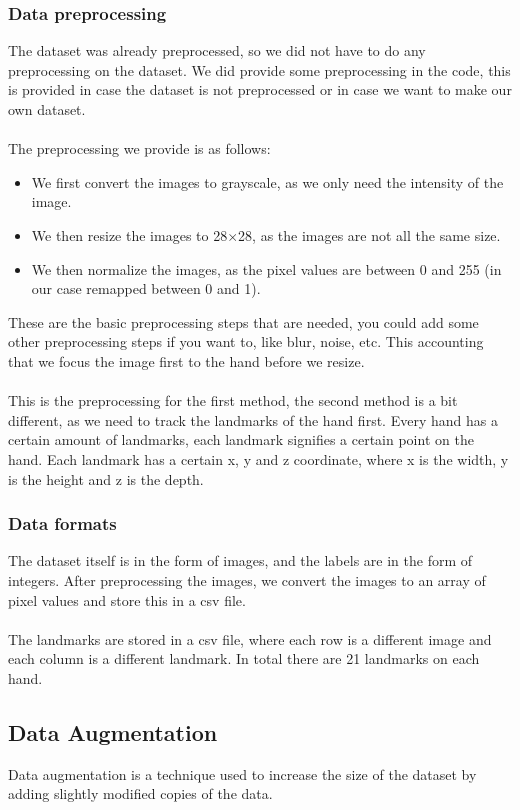 \documentclass[../paper.tex]{subfiles}
\begin{document}
    \subsubsection{Data preprocessing}
    The dataset was already preprocessed, so we did not have to do any preprocessing on the dataset. 
    We did provide some preprocessing in the code, this is provided in case the dataset is not preprocessed or in case we want to make our own dataset.\\
    \\
    The preprocessing we provide is as follows:
    \begin{itemize}
        \item We first convert the images to grayscale, as we only need the intensity of the image.
        \item We then resize the images to 28$\times$28, as the images are not all the same size.
        \item We then normalize the images, as the pixel values are between 0 and 255 (in our case remapped between 0 and 1).
    \end{itemize}
    These are the basic preprocessing steps that are needed, you could add some other preprocessing steps if you want to, like blur, noise, etc.
    This accounting that we focus the image first to the hand before we resize.
    \\\\
    This is the preprocessing for the first method, the second method is a bit different, as we need to track the landmarks of the hand first.
    Every hand has a certain amount of landmarks, each landmark signifies a certain point on the hand.
    Each landmark has a certain x, y and z coordinate, where x is the width, y is the height and z is the depth.

    \subsubsection{Data formats}
    The dataset itself is in the form of images, and the labels are in the form of integers. 
    After preprocessing the images, we convert the images to an array of pixel values and store this in a csv file.
    \\\\
    The landmarks are stored in a csv file, where each row is a different image and each column is a different landmark.
    In total there are 21 landmarks on each hand.

    \subsection{Data Augmentation}
    Data augmentation is a technique used to increase the size of the dataset by adding slightly modified copies of the data.
    

    
\end{document}
